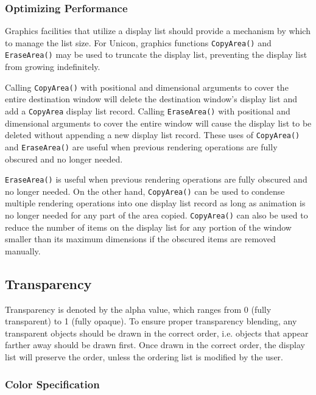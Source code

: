 \documentclass[letterpaper,12pt]{article}
\begin{document}
\subsubsection{Optimizing Performance}

Graphics facilities that utilize a display list should provide a
mechanism by which to manage the list size. For Unicon, graphics functions
\texttt{CopyArea()} and \texttt{EraseArea()} may be used to truncate
the display list, preventing the display list from growing indefinitely.

Calling \texttt{CopyArea()} with positional and 
dimensional arguments to cover the entire destination window will delete
the destination window's display list and add a \texttt{CopyArea} display 
list record. 
Calling \texttt{EraseArea()} with positional and dimensional arguments
to cover the entire window will cause the display list to be deleted without
appending a new display list record.
These uses of \texttt{CopyArea()} and \texttt{EraseArea()} are useful
when previous rendering operations are fully obscured and no longer needed.

\texttt{EraseArea()} is useful
when previous rendering operations are fully obscured and no longer needed.
On the other hand, \texttt{CopyArea()} can be used to condense multiple
rendering operations into one display list record as long as animation
is no longer needed for any part of the area copied. \texttt{CopyArea()} can 
also be used to reduce the number of items on the display list for any portion
of the window smaller than its maximum dimensions if the obscured items
are removed manually.

%
%

\subsection{Transparency}

Transparency is denoted by the alpha value, which ranges from 0 (fully
transparent) to 1 (fully opaque). 
To ensure proper transparency blending, any transparent objects should be drawn
in the correct order, i.e. objects that appear farther away should be drawn
first. Once drawn in the correct order, the display list will preserve the
order, unless the ordering list is modified by the user. 

\subsubsection{Color Specification}
\end{document}
